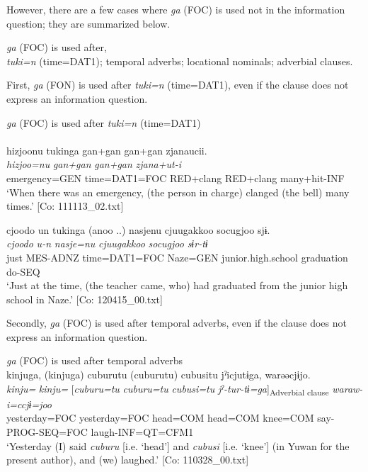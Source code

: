   However, there are a few cases where \textit{ga} (FOC) is used not in the information question; they are summarized below.

\ea\label{ex:10.12}\textit{ga} (FOC) is used after,\\
  \ea \textit{tuki=n} (time=DAT1);
  \ex temporal adverbs;
  \ex locational nominals;
  \ex adverbial clauses.
  \z
\z

First, \textit{ga} (FON) is used after \textit{tuki=n} (time=DAT1), even if the clause does not express an information question.

\ea\label{ex:10.13}   \textit{ga} (FOC) is used after \textit{tuki=n} (time=DAT1)\\
  \ea\relax  [= (4-25 c)]\\
      \glll    {\textbar}hizjoo{\textbar}nu  tukinga  gan+gan  gan+gan                  zjanaucii.\\
      \textit{hizjoo=nu}  \textit{}  \textit{gan+gan}  \textit{gan+gan}        \textit{zjana+ut-i}\\
      emergency=GEN  time=DAT1=FOC  RED+clang  RED+clang                                many+hit-INF\\
      \glt       ‘When there was an emergency, (the person in charge) clanged (the bell) many times.’ [Co: 111113\_02.txt]

  \ex  %
      \glll    {\textbar}cjoodo{\textbar}  un  tukinga  (anoo ..)  nasjenu    cjuugakkoo  {\textbar}socugjoo{\textbar}  sjɨ.\\
      \textit{cjoodo}  \textit{u-n}  \textit{}    \textit{nasje=nu}    \textit{cjuugakkoo}  \textit{socugjoo}  \textit{sɨr-tɨ}\\
      just  MES-ADNZ  time=DAT1=FOC    Naze=GEN     junior.high.school  graduation  do-SEQ  \\
      \glt       ‘Just at the time, (the teacher came, who) had graduated from the junior high school in Naze.’ [Co: 120415\_00.txt]
    \z
\z

  Secondly, \textit{ga} (FOC) is used after temporal adverbs, even if the clause does not express an information question.

\ea\label{ex:10.14}   \textit{ga} (FOC) is used after temporal adverbs\\
  \ea  %
      \glll    kinjuga,  (kinjuga)  cuburutu  (cuburutu)  cubusitu     jˀicjutɨga,  warəəcjɨjo.\\
      \textit{kinju=}  \textit{kinju=}  [\textit{cuburu=tu}  \textit{cuburu=tu}  \textit{cubusi=tu}   \textit{jˀ-tur-tɨ=ga}]\textsubscript{Adverbial clause} \textit{waraw-i=ccjɨ=joo}\\
      yesterday=FOC  yesterday=FOC  head=COM  head=COM  knee=COM say-PROG-SEQ=FOC  laugh-INF=QT=CFM1\\
      \glt       ‘Yesterday (I) said \textit{cuburu} [i.e. ‘head’] and \textit{cubusi} [i.e. ‘knee’] (in Yuwan for the present author), and (we) laughed.’ [Co: 110328\_00.txt]

